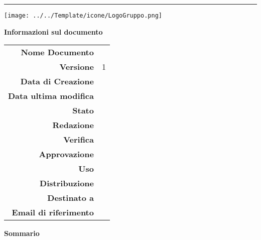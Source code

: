 \begin{center}

\begin{large} \textbf{\progetto} \end{large}
\vspace{0.2em}

\hrule
\vspace{7em}

\texttt{[image: ../../Template/icone/LogoGruppo.png]}

\thispagestyle{empty}

\vspace{1.5em}

\begin{center} 
  \begin{Huge}
  {\fontsize{15mm}{20mm}\selectfont \gruppoLink} 
  \end{Huge}
\end{center}

\vfill

\begin{Huge} \documento \end{Huge}

\begin{center}
\textbf{Informazioni sul documento} \\ \vspace{2em}
\small
\begin{tabular}{r|l}
	\textbf{Nome Documento} & \nomedocumentofisico \\
	\textbf{Versione}	& 1\\
	\textbf{Data di Creazione} & \datacreazione\\
	\textbf{Data ultima modifica} & \datamodifica\\
	\textbf{Stato} & \stato \\
	\textbf{Redazione}	& \redazione\\
	\textbf{Verifica}	& \verifica\\
	\textbf{Approvazione}	& \approvazione\\
	\textbf{Uso}  & \uso\\
	\textbf{Distribuzione} & \gruppo \\
	\textbf{Destinato a}  &  \destinateTo \\
	\textbf{Email di riferimento} & \email
\end{tabular}
\end{center}

\normalsize
\textbf{Sommario\\} 

\end{center}
\clearpage
